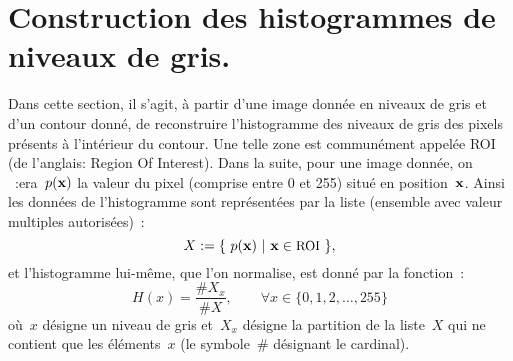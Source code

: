 \documentclass[main.tex]{subfiles}
\begin{document}
\section{Construction des histogrammes de niveaux de gris.}
Dans cette section, il s'agit, à partir d'une image donnée en niveaux de gris et d'un contour donné, de reconstruire l'histogramme des niveaux de gris des pixels présents à l'intérieur du contour. Une telle zone est communément appelée ROI (de l'anglais: Region Of Interest). Dans la suite, pour une image donnée, on ~:era~$p(\mathbf{x})$ la valeur du pixel (comprise entre 0 et 255) situé en position~$\mathbf{x}$. Ainsi les données de l'histogramme sont représentées par la liste (ensemble avec valeur multiples autorisées)~:
\begin{equation}
\label{eq:def_data_histo}
X:=\{ \ p(\mathbf{x}) \  | \  \mathbf{x} \in \textrm{\small ROI} \ \},
\end{equation}
et l'histogramme lui-même, que l'on normalise, est donné par la fonction~:
\begin{equation}
\label{eq:def_histo}
H(x) = \dfrac{ \# X_x  }{ \# X }, \qquad \forall x \in \{ 0,1,2,\ldots,255 \}
\end{equation}
où~$x$ désigne un niveau de gris et~$X_x$ désigne la partition de la liste~$X$ qui ne contient que les éléments~$x$ (le symbole~$\#$ désignant le cardinal).
\end{document}
